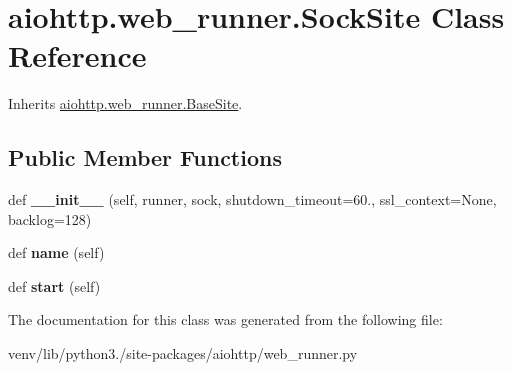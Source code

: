 \hypertarget{classaiohttp_1_1web__runner_1_1_sock_site}{}\section{aiohttp.\+web\+\_\+runner.\+Sock\+Site Class Reference}
\label{classaiohttp_1_1web__runner_1_1_sock_site}


Inherits \hyperlink{classaiohttp_1_1web__runner_1_1_base_site}{aiohttp.\+web\+\_\+runner.\+Base\+Site}.

\subsection*{Public Member Functions}
\begin{DoxyCompactItemize}
\item 
\mbox{\label{classaiohttp_1_1web__runner_1_1_sock_site_a3adccc0688db5d00abc05d06d6014b31}} 
def {\bfseries \+\_\+\+\_\+init\+\_\+\+\_\+} (self, runner, sock, shutdown\+\_\+timeout=60., ssl\+\_\+context=None, backlog=128)
\item 
\mbox{\label{classaiohttp_1_1web__runner_1_1_sock_site_aae30bf1f3bef93a486a439f31a7ffb54}} 
def {\bfseries name} (self)
\item 
\mbox{\label{classaiohttp_1_1web__runner_1_1_sock_site_adba326449cfbf7642c0d06dda489a4e0}} 
def {\bfseries start} (self)
\end{DoxyCompactItemize}


The documentation for this class was generated from the following file\+:\begin{DoxyCompactItemize}
\item 
venv/lib/python3./site-\/packages/aiohttp/web\+\_\+runner.\+py\end{DoxyCompactItemize}
